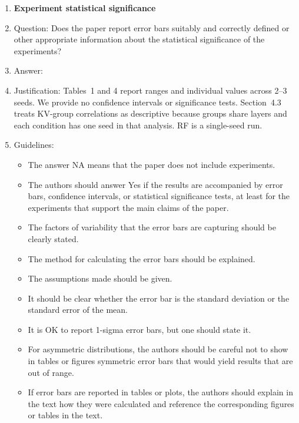 \begin{enumerate}
\item {\bf Experiment statistical significance}
    \item[] Question: Does the paper report error bars suitably and correctly defined or other appropriate information about the statistical significance of the experiments?
    \item[] Answer: \answerNo{}
    \item[] Justification: Tables~1 and 4 report ranges and individual values across 2--3 seeds. We provide no confidence intervals or significance tests. Section~4.3 treats KV-group correlations as descriptive because groups share layers and each condition has one seed in that analysis. RF is a single-seed run.
    \item[] Guidelines:
    \begin{itemize}
        \item The answer NA means that the paper does not include experiments.
        \item The authors should answer Yes if the results are accompanied by error bars, confidence intervals, or statistical significance tests, at least for the experiments that support the main claims of the paper.
        \item The factors of variability that the error bars are capturing should be clearly stated.
        \item The method for calculating the error bars should be explained.
        \item The assumptions made should be given.
        \item It should be clear whether the error bar is the standard deviation or the standard error of the mean.
        \item It is OK to report 1-sigma error bars, but one should state it.
        \item For asymmetric distributions, the authors should be careful not to show in tables or figures symmetric error bars that would yield results that are out of range.
        \item If error bars are reported in tables or plots, the authors should explain in the text how they were calculated and reference the corresponding figures or tables in the text.
    \end{itemize}


\end{enumerate}
